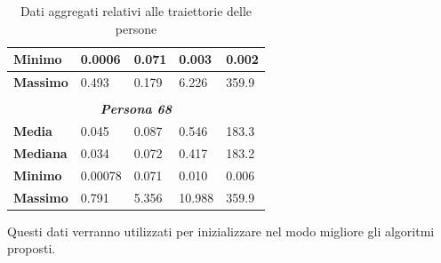 \documentclass[12pt]{article}
\begin{document}
\begin{table}[!ht]
\begin{tabular}{|l|l|l|l|l|}
        \hline
        \textbf{Minimo}       & 0.0006                                 & 0.071                                & 0.003                                  & 0.002                                       \\
        \hline
        \textbf{Massimo}      & 0.493                                  & 0.179                                & 6.226                                  & 359.9                                       \\
        \hline
        \multicolumn{1}{l}{}  & \multicolumn{1}{l}{}                   & \multicolumn{1}{l}{}                 & \multicolumn{1}{l}{}                   & \multicolumn{1}{l}{}                        \\
        \multicolumn{5}{c}{\textbf{\textit{Persona 68}}}                                                                                                                                             \\
        \hline
        \textbf{Media}        & 0.045                                  & 0.087                                & 0.546                                  & 183.3                                       \\
        \hline
        \textbf{Mediana}      & 0.034                                  & 0.072                                & 0.417                                  & 183.2                                       \\
        \hline
        \textbf{Minimo}       & 0.00078                                & 0.071                                & 0.010                                  & 0.006                                       \\
        \hline
        \textbf{Massimo}      & 0.791                                  & 5.356                                & 10.988                                 & 359.9                                       \\
        \hline
    \end{tabular}
    \caption{Dati aggregati relativi alle traiettorie delle persone}
\end{table}
\FloatBarrier
Questi dati verranno utilizzati per inizializzare nel modo migliore gli algoritmi proposti.
\end{document}
